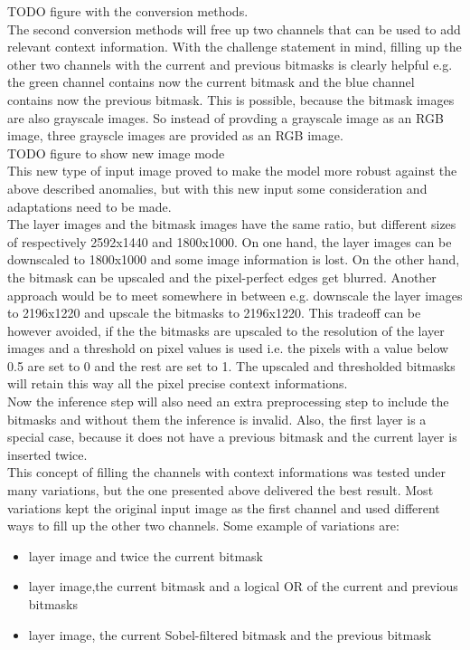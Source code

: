 TODO figure with the conversion methods. \\

The second conversion methods will free up two channels that can be used to add relevant context information. With the challenge statement in mind, filling up the other two channels with the current and previous bitmasks is clearly helpful e.g. the green channel contains now the current bitmask and the blue channel contains now the previous bitmask. This is possible, because the bitmask images are also grayscale images. So instead of provding a grayscale image as an RGB image, three grayscle images are provided as an RGB image. \\

TODO figure to show new image mode \\

This new type of input image proved to make the model more robust against the above described anomalies, but with this new input some consideration and adaptations need to be made. \\
The layer images and the bitmask images have the same ratio, but different sizes of respectively 2592x1440 and 1800x1000. On one hand, the layer images can be downscaled to 1800x1000 and some image information is lost. On the other hand, the bitmask can be upscaled and the pixel-perfect edges get blurred. Another approach would be to meet somewhere in between e.g. downscale the layer images to 2196x1220 and upscale the bitmasks to 2196x1220. This tradeoff can be however avoided, if the the bitmasks are upscaled to the resolution of the layer images and a threshold on pixel values is used i.e. the pixels with a value below 0.5 are set to 0 and the rest are set to 1. The upscaled and thresholded bitmasks will retain this way all the pixel precise context informations.  \\
Now the inference step will also need an extra preprocessing step to include the bitmasks and without them the inference is invalid. Also, the first layer is a special case, because it does not have a previous bitmask and the current layer is inserted twice. \\
This concept of filling the channels with context informations was tested under many variations, but the one presented above delivered the best result. Most variations kept the original input image as the first channel and used different ways to fill up the other two channels. Some example of variations are:
\begin{itemize}
\item layer image and twice the current bitmask
\item layer image,the current bitmask and a logical OR of the current and previous bitmasks
\item layer image, the current Sobel-filtered bitmask and the previous bitmask
\end{itemize}
